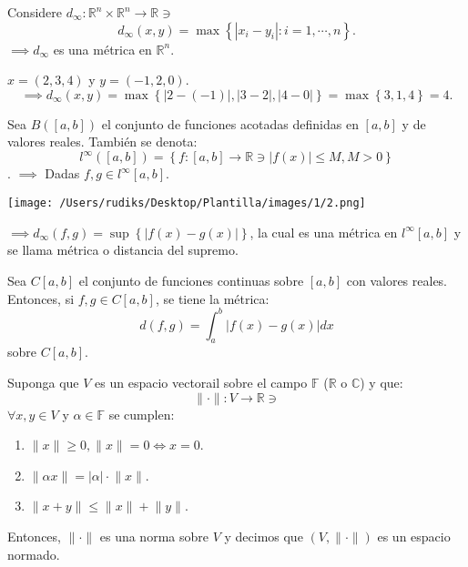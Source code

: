 \begin{ejemplo}
	Considere $d_\infty: \mathbb{R}^n\times \mathbb{R}^n\to \mathbb{R}\ni$ 
	$$d_\infty (x,y)=\max\left\{|x_i-y_i|:i=1,\cdots, n\right\}.$$
	$\implies d_\infty$ es una métrica en $\mathbb{R}^n$. 
\end{ejemplo}

\begin{ejemplo}
	$x=(2,3,4)$ y $y=(-1,2,0)$. 
	$$\implies d_\infty(x,y)=\max\left\{|2-(-1)|,|3-2|,|4-0|\right\}=\max\left\{3,1,4\right\}=4.$$
\end{ejemplo}

\begin{ejemplo}
	Sea $B\left([a,b]\right)$ el conjunto de funciones acotadas definidas en $[a,b]$ y de valores reales. También se denota: 
	$$l^{\infty}\left([a,b]\right)=\left\{f:[a,b]\to \mathbb{R}\ni |f(x)|\leq M, M>0\right\}$$.
	$\implies$ Dadas $f,g\in l^{\infty}[a,b]$. 
	
	\begin{center}
		\texttt{[image: /Users/rudiks/Desktop/Plantilla/images/1/2.png]}
	\end{center}
$\implies d_\infty(f,g)=\sup \left\{|f(x)-g(x)|\right\}$, la cual es una métrica en $l^{\infty}[a,b]$ y se llama métrica o distancia del supremo.
\end{ejemplo}

\begin{ejemplo}
	Sea $C[a,b]$ el conjunto de funciones continuas sobre $[a,b]$ con valores reales. Entonces, si $f,g\in C[a,b]$, se tiene la métrica: $$d(f,g)=\int_a^b |f(x)-g(x)|dx$$
	sobre $C[a,b]$. 
\end{ejemplo}

\begin{definicion}
Suponga que $V$ es un espacio vectorail sobre el campo $\mathbb{F}$ ($\mathbb{R}$ o $\mathbb{C}$) y que: 
$$\lVert \cdot \rVert: V\to \mathbb{R}\ni $$
$\forall x,y\in V$ y $\alpha \in\mathbb{F}$ se cumplen: 
\begin{enumerate}
	\item $\lVert x\rVert\geq 0, \lVert x\rVert =0 \iff x=0$. 
	\item $\lVert \alpha x \rVert = |\alpha| \cdot \lVert x \rVert$. 
	\item $\lVert x+y\rVert \leq \lVert x\rVert + \lVert y\rVert$. 
\end{enumerate}
Entonces, $\lVert \cdot \rVert$ es una norma sobre $V$ y decimos que $(V, \lVert\cdot \rVert)$ es un espacio normado.
\end{definicion}

